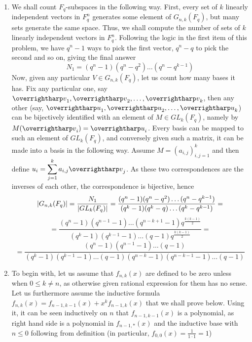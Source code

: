 \documentclass[8pt]{article} %
\begin{document}
\begin{enumerate}[label=\bfseries Problem \arabic*.]
{\begin{enumerate}[label=(\arabic*).]
{				We claim that the set of {\it upper triangular matrices with all diagonal elements equal to 1} will do. They do form a subgroup, as
				they are a subset of $\M$ (in fact, each of them has determinant equal to 1)
				closed under multiplication, identity belongs to this set as well as inverse of any element (this is true, as
				can be seen most easily by computing inverse via the matrix of cofactors). And the order of this subgroup is precisely
				$q^{\frac{n(n-1)}{2}})$, as we have zeros below the diagonal, ones on diagonal and places above the diagonal can be filled with
				anything -- and we have $\frac{n(n-1)}{2}$ of such places.
				}
			\item{We shall count $F_q$-subspaces in the following way. First, every set of $k$ linearly independent vectors
				in $F_q^n$ generates some element of $G_{n,k}(F_q)$, but many sets generate the same space. Thus, we shall compute
				the number of sets of $k$ linearly independent vectors in $F_q^n$. Following the logic in the first item of this
				problem, we have $q^n-1$ ways to pick the first vector, $q^n-q$ to pick the second and so on, giving the final
				answer
				\[N_1=(q^n-1)(q^n-q^2)\dots(q^n-q^{k-1})\]
				Now, given any particular $V\in G_{n,k}(F_q)$, let us count how many bases it has. Fix any particular one,
				say $\myvec{v}_1,\myvec{v}_2,\dots,\myvec{v}_k$, then any other (say, 
				$\myvec{u}_1,\myvec{u}_2,\dots,\myvec{u}_k$) can be bijectively identified with an element of $M\in GL_k(F_q)$,
				namely by $M(\myvec{v}_i)=\myvec{u}_i$. Every basis can be mapped to such an element of $GL_k(F_q)$, and conversely
				given such a matrix, it can be made into a basis in the following way. Assume $M=(a_{i,j})_{i,j=1}^k$ and then
				define $u_i=\sum_{j=1}^k a_{i,j}\myvec{v}_j$. As these two correspondences are the inverses of each other, the 
				correspondence is bijective, hence
				\[\left|G_{n,k}(F_q)\right|=\frac{N_1}{\left|GL_k(F_q)\right|}=\frac{(q^n-1)(q^n-q^2)\dots(q^n-q^{k-1})}
				{(q^k-1)(q^{k}-q)\dots(q^k-q^{k-1})}=\]
				\[=\frac{(q^n-1)(q^{n-1}-1)\dots(q^{n-k+1}-1)q^{\frac{k(k-1)}{2}}}{(q^k-1)(q^{k-1}-1)
				\dots(q-1)q^{\frac{k(k-1)}{2}}}=\]\[=
				\frac{(q^n-1)(q^{n-1}-1)\dots(q-1)}{(q^k-1)(q^{k-1}-1)\dots(q-1)(q^{n-k}-1)(q^{n-k-1}-1)\dots(q-1)}\]
				}
			\item{To begin with, let us assume that $f_{n,k}(x)$ are defined to be zero unless when $0\leq k\neq n$, as otherwise
				given rational expression for them has no sense. Let us furthermore assume the inductive formula
				$f_{n,k}(x)=f_{n-1,k-1}(x)+x^kf_{n-1,k}(x)$ that we shall prove below. Using it, it can be seen
				inductively on $n$ that $f_{n-1,k-1}(x)$ is a polynomial, as right hand side is a polynomial in $f_{n-1,\ast}(x)$ and the inductive
				base with $n\leq 0$ following from definition (in particular, $f_{0,0}(x)=\frac{1}{1\cdot 1}=1$)
				
}
\end{enumerate}}
\end{enumerate}
\end{document}
